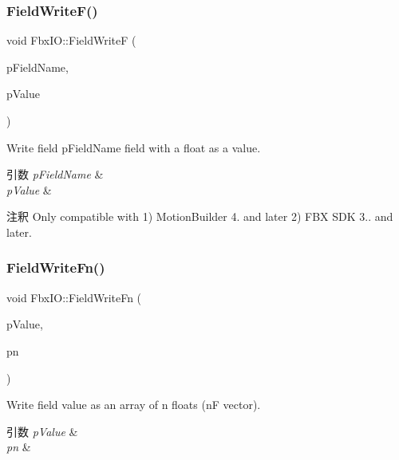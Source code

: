 \subsubsection{\texorpdfstring{Field\+Write\+F()}{FieldWriteF()}\hspace{0.1cm}{\footnotesize\ttfamily [2/2]}}
{\footnotesize\ttfamily void Fbx\+I\+O\+::\+Field\+WriteF (\begin{DoxyParamCaption}\item[{const char $\ast$}]{p\+Field\+Name,  }\item[{float}]{p\+Value }\end{DoxyParamCaption})}

Write field p\+Field\+Name field with a float as a value. 
\begin{DoxyParams}{引数}
{\em p\+Field\+Name} & \\
\hline
{\em p\+Value} & \\
\hline
\end{DoxyParams}
\begin{DoxyRemark}{注釈}
Only compatible with 1) Motion\+Builder 4. and later 2) F\+BX S\+DK 3.. and later. 
\end{DoxyRemark}
\mbox{\label{class_fbx_i_o_ae5f4c87e58130bb99901fcbff94c4011}} 
\subsubsection{\texorpdfstring{Field\+Write\+Fn()}{FieldWriteFn()}\hspace{0.1cm}{\footnotesize\ttfamily [1/2]}}
{\footnotesize\ttfamily void Fbx\+I\+O\+::\+Field\+Write\+Fn (\begin{DoxyParamCaption}\item[{const float $\ast$}]{p\+Value,  }\item[{\hyperlink{fbxtypes_8h_ae9fb141d8158a730aa85ec5ff2ea3f6b}{Fbx\+U\+Int}}]{pn }\end{DoxyParamCaption})}

Write field value as an array of n floats (nF vector). 
\begin{DoxyParams}{引数}
{\em p\+Value} & \\
\hline
{\em pn} & \\
\hline
\end{DoxyParams}
\mbox{\label{class_fbx_i_o_a7f98be1e94aeef3d50bf11993cf41f78}} 
